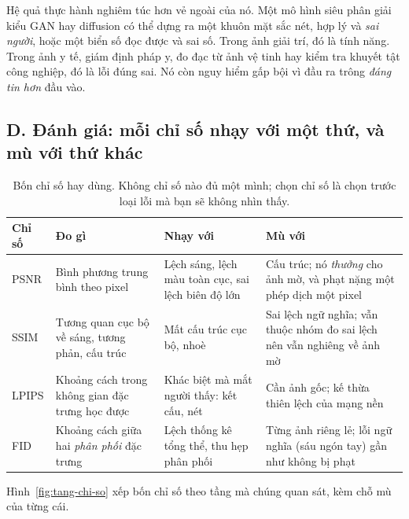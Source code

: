 \documentclass[../../../deep_learning.tex]{subfiles}
\begin{document}
Hệ quả thực hành nghiêm túc hơn vẻ ngoài của nó. Một mô hình siêu phân giải kiểu GAN hay diffusion \cite{ledig2017srgan} có thể dựng ra một khuôn mặt sắc nét, hợp lý và \emph{sai người}, hoặc một biển số đọc được và sai số. Trong ảnh giải trí, đó là tính năng. Trong ảnh y tế, giám định pháp y, đo đạc từ ảnh vệ tinh hay kiểm tra khuyết tật công nghiệp, đó là lỗi đúng sai. Nó còn nguy hiểm gấp bội vì đầu ra trông \emph{đáng tin hơn} đầu vào.

\subsection{D. Đánh giá: mỗi chỉ số nhạy với một thứ, và mù với thứ khác}

\begin{table}[H]\centering\small
\caption{Bốn chỉ số hay dùng. Không chỉ số nào đủ một mình; chọn chỉ số là chọn trước loại lỗi mà bạn sẽ không nhìn thấy.}
\label{tab:chi-so-ll}
\begin{tabularx}{\linewidth}{@{}L{1.7cm}YYY@{}}
\toprule
\textbf{Chỉ số} & \textbf{Đo gì} & \textbf{Nhạy với} & \textbf{Mù với}\\
\midrule
PSNR & Bình phương trung bình theo pixel & Lệch sáng, lệch màu toàn cục, sai lệch biên độ lớn & Cấu trúc; nó \emph{thưởng} cho ảnh mờ, và phạt nặng một phép dịch một pixel\\
SSIM & Tương quan cục bộ về sáng, tương phản, cấu trúc \cite{wang2004ssim} & Mất cấu trúc cục bộ, nhoè & Sai lệch ngữ nghĩa; vẫn thuộc nhóm đo sai lệch nên vẫn nghiêng về ảnh mờ\\
LPIPS & Khoảng cách trong không gian đặc trưng học được \cite{zhang2018lpips} & Khác biệt mà mắt người thấy: kết cấu, nét & Cần ảnh gốc; kế thừa thiên lệch của mạng nền\\
FID & Khoảng cách giữa hai \emph{phân phối} đặc trưng \cite{heusel2017fid} & Lệch thống kê tổng thể, thu hẹp phân phối & Từng ảnh riêng lẻ; lỗi ngữ nghĩa (sáu ngón tay) gần như không bị phạt\\
\bottomrule
\end{tabularx}
\end{table}

Hình~\ref{fig:tang-chi-so} xếp bốn chỉ số theo tầng mà chúng quan sát, kèm chỗ mù của từng cái.
\end{document}
